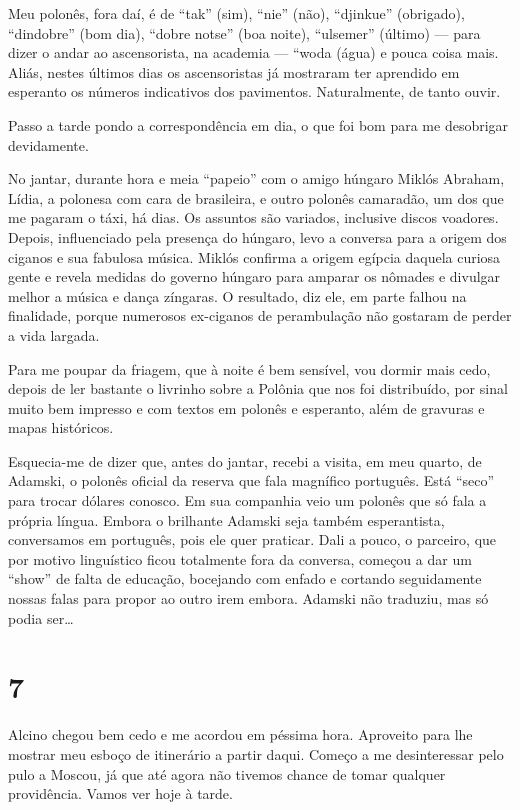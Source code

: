 Meu polonês, fora daí, é de ``tak'' (sim), ``nie'' (não), ``djinkue'' (obrigado), ``dindobre'' (bom dia), ``dobre notse'' (boa noite), ``ulsemer'' (último) --- para dizer o andar ao ascensorista, na academia --- ``woda (água) e pouca coisa mais. Aliás, nestes últimos dias os ascensoristas já mostraram ter aprendido em esperanto os números indicativos dos pavimentos. Naturalmente, de tanto ouvir.

Passo a tarde pondo a correspondência em dia, o que foi bom para me desobrigar devidamente.

No jantar, durante hora e meia ``papeio'' com o amigo húngaro Miklós Abraham, Lídia, a polonesa com cara de brasileira, e outro polonês camaradão, um dos que me pagaram o táxi, há dias. Os assuntos são variados, inclusive discos voadores. Depois, influenciado pela presença do húngaro, levo a conversa para a origem dos ciganos e sua fabulosa música. Miklós confirma a origem egípcia daquela curiosa gente e revela medidas do governo húngaro para amparar os nômades e divulgar melhor a música e dança zíngaras. O resultado, diz ele, em parte falhou na finalidade, porque numerosos ex-ciganos de perambulação não gostaram de perder a vida largada.

Para me poupar da friagem, que à noite é bem sensível, vou dormir mais cedo, depois de ler bastante o livrinho sobre a Polônia que nos foi distribuído, por sinal muito bem impresso e com textos em polonês e esperanto, além de gravuras e mapas históricos.

Esquecia-me de dizer que, antes do jantar, recebi a visita, em meu quarto, de Adamski, o polonês oficial da reserva que fala magnífico português. Está ``seco'' para trocar dólares conosco. Em sua companhia veio um polonês que só fala a própria língua. Embora o brilhante Adamski seja também esperantista, conversamos em português, pois ele quer praticar. Dali a pouco, o parceiro, que por motivo linguístico ficou totalmente fora da conversa, começou a dar um ``show'' de falta de educação, bocejando com enfado e cortando seguidamente nossas falas para propor ao outro irem embora. Adamski não traduziu, mas só podia ser\ldots

\section*{7 \adfflatleafright {}}
Alcino chegou bem cedo e me acordou em péssima hora. Aproveito para lhe mostrar meu esboço de itinerário a partir daqui. Começo a me desinteressar pelo pulo a Moscou, já que até agora não tivemos chance de tomar qualquer providência. Vamos ver hoje à tarde.

